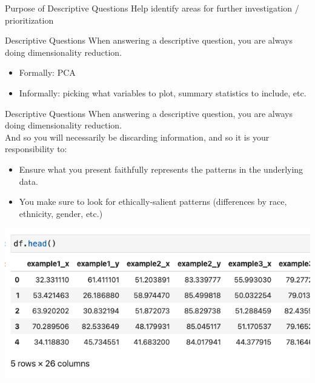 \documentclass[11pt]{beamer}
\begin{document}
\begin{frame}[c]{Purpose of Descriptive Questions}
\pause Help identify areas for further investigation / prioritization 
\end{frame}
  

\begin{frame}[c]{Descriptive Questions}
\pause When answering a descriptive question, you are always doing \alert{dimensionality reduction}.
\begin{itemize}
  \pause \item Formally: PCA
  \pause \item Informally: picking what variables to plot, summary statistics to include, etc. 
\end{itemize}
\end{frame}

\begin{frame}[c]{Descriptive Questions}
  When answering a descriptive question, you are always doing \alert{dimensionality reduction}. \pause \\
  And so you will necessarily be \alert{discarding information}, and so it is \alert{your responsibility to:}
  \begin{itemize}
    \pause \item Ensure what you present faithfully represents the patterns in the underlying data. 
    \pause \item You make sure to look for ethically-salient patterns (differences by race, ethnicity, gender, etc.)
  \end{itemize}
  \end{frame}
  

\begin{frame}[c]{}
\includegraphics[width=\textwidth]{datasaurus_1.png}
\end{frame}
\end{document}
